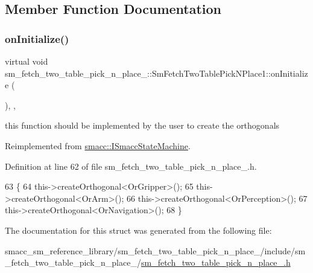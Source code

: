 \subsection{Member Function Documentation}
\mbox{\label{structsm__fetch__two__table__pick__n__place__1_1_1SmFetchTwoTablePickNPlace1_a30c707dad93553ebd88c0bb82a8586c5}} 
\subsubsection{\texorpdfstring{on\+Initialize()}{onInitialize()}}
{\footnotesize\ttfamily virtual void sm\+\_\+fetch\+\_\+two\+\_\+table\+\_\+pick\+\_\+n\+\_\+place\+\_\+::\+Sm\+Fetch\+Two\+Table\+Pick\+N\+Place1\+::on\+Initialize (\begin{DoxyParamCaption}{ }\end{DoxyParamCaption})\hspace{0.3cm}{\ttfamily [inline]}, {\ttfamily [override]}, {\ttfamily [virtual]}}



this function should be implemented by the user to create the orthogonals 



Reimplemented from \hyperlink{classsmacc_1_1ISmaccStateMachine_ac2982c6c8283663e5e1e8a7c82f511ec}{smacc\+::\+I\+Smacc\+State\+Machine}.



Definition at line 62 of file sm\+\_\+fetch\+\_\+two\+\_\+table\+\_\+pick\+\_\+n\+\_\+place\+\_.\+h.


\begin{DoxyCode}
63     \{
64         this->createOrthogonal<OrGripper>();
65         this->createOrthogonal<OrArm>();
66         this->createOrthogonal<OrPerception>();
67         this->createOrthogonal<OrNavigation>();
68     \}
\end{DoxyCode}


The documentation for this struct was generated from the following file\+:\begin{DoxyCompactItemize}
\item 
smacc\+\_\+sm\+\_\+reference\+\_\+library/sm\+\_\+fetch\+\_\+two\+\_\+table\+\_\+pick\+\_\+n\+\_\+place\+\_/include/sm\+\_\+fetch\+\_\+two\+\_\+table\+\_\+pick\+\_\+n\+\_\+place\+\_/\hyperlink{sm__fetch__two__table__pick__n__place__1_8h}{sm\+\_\+fetch\+\_\+two\+\_\+table\+\_\+pick\+\_\+n\+\_\+place\+\_.\+h}\end{DoxyCompactItemize}
